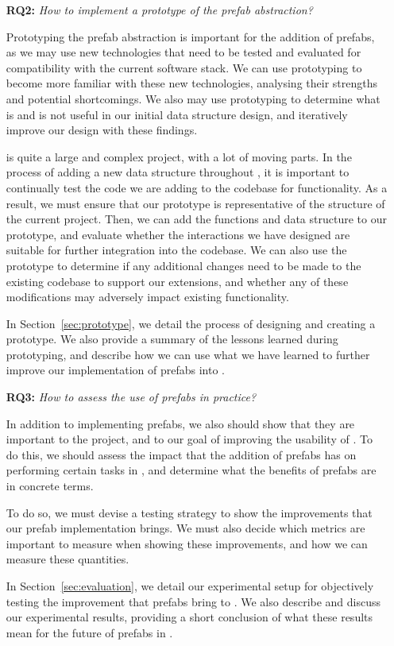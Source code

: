 \documentclass[11pt]{article}
\begin{document}
\begin{itemize}
			\item [\textbf{RQ2:}] \textit{How to implement a prototype of the prefab abstraction?}

			Prototyping the prefab abstraction is important for the addition of prefabs, as we may use new technologies that need to be tested and evaluated for compatibility with the current \opendc{} software stack.
			We can use prototyping to become more familiar with these new technologies, analysing their strengths and potential shortcomings.
			We also may use prototyping to determine what is and is not useful in our initial data structure design, and iteratively improve our design with these findings.

			\opendc{} is quite a large and complex project, with a lot of moving parts.
			In the process of adding a new data structure throughout \opendc{}, it is important to continually test the code we are adding to the codebase for functionality.
			As a result, we must ensure that our prototype is representative of the structure of the current \opendc{} project.
			Then, we can add the functions and data structure to our prototype, and evaluate whether the interactions we have designed are suitable for further integration into the \opendc{} codebase.
			We can also use the prototype to determine if any additional changes need to be made to the existing codebase to support our extensions, and whether any of these modifications may adversely impact existing functionality.

			In Section~\ref{sec:prototype}, we detail the process of designing and creating a prototype.
			We also provide a summary of the lessons learned during prototyping, and describe how we can use what we have learned to further improve our implementation of prefabs into \opendc{}.
			\item [\textbf{RQ3:}] \textit{How to assess the use of prefabs in practice?}

			In addition to implementing prefabs, we also should show that they are important to the \opendc{} project, and to our goal of improving the usability of \opendc{}.
			To do this, we should assess the impact that the addition of prefabs has on performing certain tasks in \opendc{}, and determine what the benefits of prefabs are in concrete terms.

			To do so, we must devise a testing strategy to show the improvements that our prefab implementation brings.
			We must also decide which metrics are important to measure when showing these improvements, and how we can measure these quantities.

			In Section~\ref{sec:evaluation}, we detail our experimental setup for objectively testing the improvement that prefabs bring to \opendc{}.
			We also describe and discuss our experimental results, providing a short conclusion of what these results mean for the future of prefabs in \opendc{}.
			
		\end{itemize}
	
\end{document}
